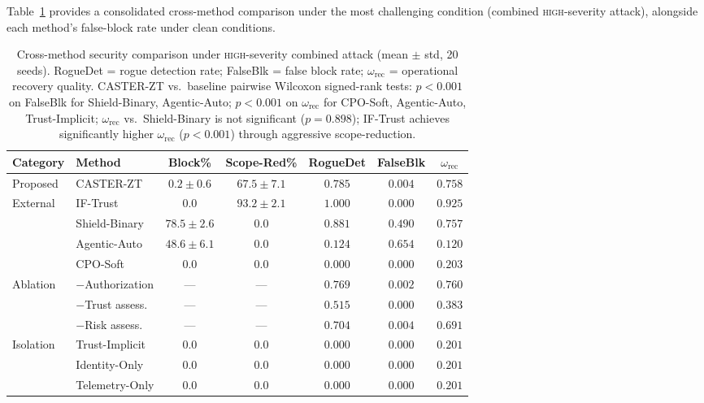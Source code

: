 \documentclass[10pt,journal,compsoc]{IEEEtran}
\begin{document}
Table~\ref{tab:cross_method} provides a consolidated cross-method comparison under the most challenging condition (combined \textsc{high}-severity attack), alongside each method's false-block rate under clean conditions.

\begin{table}[t]
\centering
\caption{Cross-method security comparison under \textsc{high}-severity combined attack (mean $\pm$ std, 20 seeds).  RogueDet = rogue detection rate; FalseBlk = false block rate; $\omega_{\mathrm{rec}}$ = operational recovery quality.  CASTER-ZT vs.\ baseline pairwise Wilcoxon signed-rank tests: $p < 0.001$ on FalseBlk for Shield-Binary, Agentic-Auto; $p < 0.001$ on $\omega_{\mathrm{rec}}$ for CPO-Soft, Agentic-Auto, Trust-Implicit; $\omega_{\mathrm{rec}}$ vs.\ Shield-Binary is not significant ($p = 0.898$); IF-Trust achieves significantly higher $\omega_{\mathrm{rec}}$ ($p < 0.001$) through aggressive scope-reduction.}
\label{tab:cross_method}
\footnotesize
\begin{tabular}{llccccc}
\toprule
Category & Method & Block\% & Scope-Red\% & RogueDet & FalseBlk & $\omega_{\mathrm{rec}}$ \\
\midrule
Proposed & CASTER-ZT & $0.2\pm0.6$ & $67.5\pm7.1$ & $\mathbf{0.785}$ & $\mathbf{0.004}$ & $\mathbf{0.758}$ \\
\midrule
\multirow{4}{*}{External}
  & IF-Trust~\cite{zahoor2025ifocsvm} & $0.0$ & $93.2\pm2.1$ & $1.000$ & $0.000$ & $0.925$ \\
  & Shield-Binary~\cite{alshiekh2018shielding} & $78.5\pm2.6$ & $0.0$ & $0.881$ & $0.490$ & $0.757$ \\
  & Agentic-Auto~\cite{toward_autonomous_oran_2026} & $48.6\pm6.1$ & $0.0$ & $0.124$ & $0.654$ & $0.120$ \\
  & CPO-Soft~\cite{achiam2017cpo} & $0.0$ & $0.0$ & $0.000$ & $0.000$ & $0.203$ \\
\midrule
\multirow{3}{*}{Ablation}
  & $-$Authorization & --- & --- & $0.769$ & $0.002$ & $0.760$ \\
  & $-$Trust assess. & --- & --- & $0.515$ & $0.000$ & $0.383$ \\
  & $-$Risk assess. & --- & --- & $0.704$ & $0.004$ & $0.691$ \\
\midrule
\multirow{3}{*}{Isolation}
  & Trust-Implicit & $0.0$ & $0.0$ & $0.000$ & $0.000$ & $0.201$ \\
  & Identity-Only & $0.0$ & $0.0$ & $0.000$ & $0.000$ & $0.201$ \\
  & Telemetry-Only & $0.0$ & $0.0$ & $0.000$ & $0.000$ & $0.201$ \\
\bottomrule
\end{tabular}
\end{table}
\end{document}
